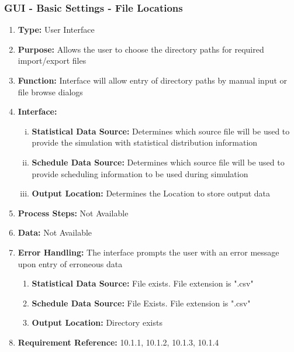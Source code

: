 \documentclass[paper=letter, fontsize=10pt]{scrartcl}
\numberwithin{equation}{section}		%
\numberwithin{figure}{section}			%
\numberwithin{table}{section}				%
\begin{document}
\subsubsection{GUI - Basic Settings - File Locations}
\begin{enumerate}[]
	\item \textbf{Type:} User Interface
	\item \textbf{Purpose:} Allows the user to choose the directory paths for required import/export files
	\item \textbf{Function:} Interface will allow entry of directory paths by manual input or file browse dialogs
	\item \textbf{Interface:}  
	\begin{enumerate}[(i)]
		\item \textbf{Statistical Data Source:} Determines which source file will be used to provide the simulation with statistical distribution information
		\item \textbf{Schedule Data Source:} Determines which source file will be used to provide scheduling information to be used during simulation
		\item \textbf{Output Location:} Determines the Location to store output data
	\end{enumerate}
	\item \textbf{Process Steps:} Not Available
	\item \textbf{Data:} Not Available
	\item \textbf{Error Handling:} The interface prompts the user with an error message upon entry of erroneous data
	\begin{enumerate}[]
		\item \textbf{Statistical Data Source:} File exists. File extension is ".csv"
		\item \textbf{Schedule Data Source:} File Exists. File extension is ".csv"
		\item \textbf{Output Location:} Directory exists
	\end{enumerate}
	\item \textbf{Requirement Reference:} 10.1.1, 10.1.2, 10.1.3, 10.1.4
\end{enumerate}
\end{document}
